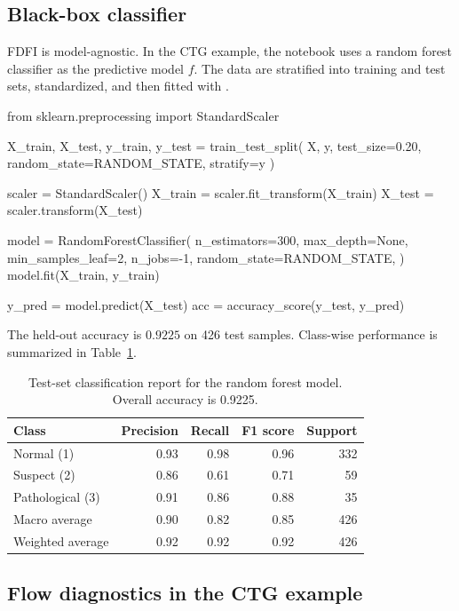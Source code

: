 \subsection{Black-box classifier}

FDFI is model-agnostic. In the CTG example, the notebook uses a random forest
classifier as the predictive model $f$. The data are stratified into training
and test sets, standardized, and then fitted with
.
%
\begin{Code}
from sklearn.preprocessing import StandardScaler

X_train, X_test, y_train, y_test = train_test_split(
    X, y, test_size=0.20, random_state=RANDOM_STATE, stratify=y
)

scaler = StandardScaler()
X_train = scaler.fit_transform(X_train)
X_test = scaler.transform(X_test)

model = RandomForestClassifier(
    n_estimators=300,
    max_depth=None,
    min_samples_leaf=2,
    n_jobs=-1,
    random_state=RANDOM_STATE,
)
model.fit(X_train, y_train)

y_pred = model.predict(X_test)
acc = accuracy_score(y_test, y_pred)
\end{Code}
%
The held-out accuracy is $0.9225$ on 426 test samples. Class-wise performance
is summarized in Table~\ref{tab:classification-report}.

\begin{table}[t!]
\centering
\begin{tabular}{lrrrr}
\hline
Class & Precision & Recall & F1 score & Support \\ \hline
Normal (1) & 0.93 & 0.98 & 0.96 & 332 \\
Suspect (2) & 0.86 & 0.61 & 0.71 & 59 \\
Pathological (3) & 0.91 & 0.86 & 0.88 & 35 \\
Macro average & 0.90 & 0.82 & 0.85 & 426 \\
Weighted average & 0.92 & 0.92 & 0.92 & 426 \\ \hline
\end{tabular}
\caption{\label{tab:classification-report} Test-set classification report for
the random forest model. Overall accuracy is 0.9225.}
\end{table}

\subsection{Flow diagnostics in the CTG example}

